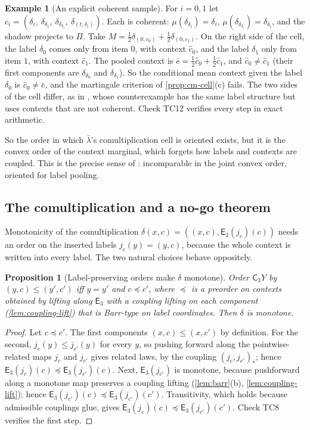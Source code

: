 \documentclass[11pt]{article}
\newtheorem{proposition}[theorem]{Proposition}
\theoremstyle{definition}
\newtheorem{example}[theorem]{Example}
\newcommand{\C}{\mathsf C}
\newcommand{\lb}{\bar\lambda}
\newcommand{\E}{\mathsf E}
\begin{document}
\begin{example}[An explicit coherent sample]\label{ex:cm-coherent}
For $i=0,1$ let $c_i=(\delta_i,\ \delta_{\delta_i},\ \delta_{\delta_{\delta_i}},\ \delta_{(t,\delta_i)})$. Each is coherent:
$\mu(\delta_{\delta_i})=\delta_i$, $\mu(\delta_{\delta_{\delta_i}})=\delta_{\delta_i}$, and the shadow projects to $\Pi$. Take
$M=\tfrac12\delta_{(0,c_0)}+\tfrac12\delta_{(0,c_1)}$. On the right side of the cell, the label $\delta_0$ comes only from item $0$, with
context $\hat c_0$, and the label $\delta_1$ only from item $1$, with context $\hat c_1$. The pooled context is
$\bar e=\tfrac12\hat c_0+\tfrac12\hat c_1$, and $\hat c_0\ne\hat c_1$ (their first components are $\delta_{\delta_0}$ and $\delta_{\delta_1}$).
So the conditional mean context given the label $\delta_0$ is $\hat c_0\ne\bar e$, and the martingale criterion of
\cref{prop:cm-cell}(c) fails. The two sides of the cell differ, as in \cite[Thm.~8.7]{Tower}, whose counterexample has the same label
structure but uses contexts that are not coherent. Check TC12 verifies every step in exact arithmetic.
\end{example}

So the order in which $\lb$'s comultiplication cell is oriented exists, but it is the convex order of the context marginal, which
forgets how labels and contexts are coupled. This is the precise sense of \cite[Prop.~13.10, Thm.~13.16]{Tower}: incomparable in the
joint convex order, oriented for label pooling.

\subsection{The comultiplication and a no-go theorem}
Monotonicity of the comultiplication $\delta(x,c)=((x,c),\E_3(j_c)(c))$ needs an order on the inserted labels $j_c(y)=(y,c)$, because
the whole context is written into every label. The two natural choices behave oppositely.

\begin{proposition}[Label-preserving orders make $\delta$ monotone]\label{prop:delta-mono}
Order $\C_3Y$ by $(y,c)\le(y',c')$ iff $y=y'$ and $c\preccurlyeq c'$, where $\preccurlyeq$ is a preorder on contexts obtained by lifting
along $\E_3$ with a coupling lifting on each component (\cref{lem:coupling-lift}) that is Barr-type on label coordinates. Then $\delta$ is
monotone.
\end{proposition}
\begin{proof}
Let $c\preccurlyeq c'$. The first components $(x,c)\le(x,c')$ by definition. For the second, $j_c(y)\le j_{c'}(y)$ for every $y$, so pushing
forward along the pointwise-related maps $j_c$ and $j_{c'}$ gives related laws, by the coupling $(j_c,j_{c'})_*$; hence
$\E_3(j_c)(c)\preccurlyeq\E_3(j_{c'})(c)$. Next, $\E_3(j_{c'})$ is monotone, because pushforward along a monotone map preserves a coupling
lifting (\cref{lem:barr}(b), \cref{lem:coupling-lift}); hence $\E_3(j_{c'})(c)\preccurlyeq\E_3(j_{c'})(c')$. Transitivity, which holds because
admissible couplings glue, gives $\E_3(j_c)(c)\preccurlyeq\E_3(j_{c'})(c')$. Check TC8 verifies the first step.
\end{proof}
\end{document}
